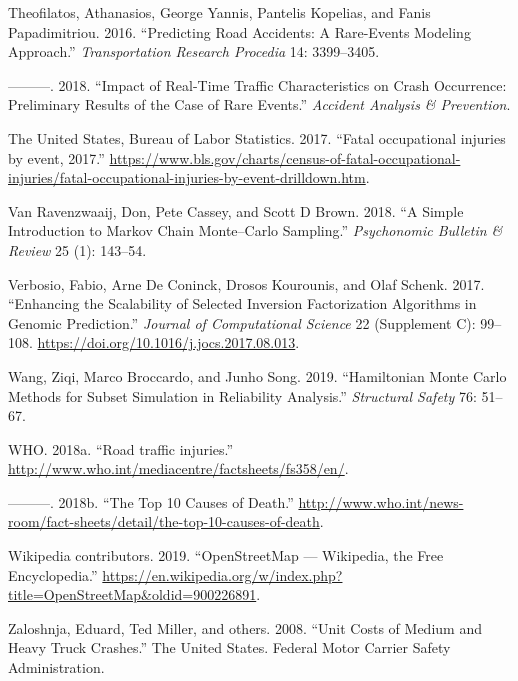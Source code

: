 \documentclass[12pt]{book}
\numberwithin{equation}{chapter}
\begin{document}
\leavevmode\hypertarget{ref-theofilatos2016predicting}{}%
Theofilatos, Athanasios, George Yannis, Pantelis Kopelias, and Fanis Papadimitriou. 2016. ``Predicting Road Accidents: A Rare-Events Modeling Approach.'' \emph{Transportation Research Procedia} 14: 3399--3405.

\leavevmode\hypertarget{ref-theofilatos2018impact}{}%
---------. 2018. ``Impact of Real-Time Traffic Characteristics on Crash Occurrence: Preliminary Results of the Case of Rare Events.'' \emph{Accident Analysis \& Prevention}.

\leavevmode\hypertarget{ref-bols}{}%
The United States, Bureau of Labor Statistics. 2017. ``Fatal occupational injuries by event, 2017.'' \url{https://www.bls.gov/charts/census-of-fatal-occupational-injuries/fatal-occupational-injuries-by-event-drilldown.htm}.

\leavevmode\hypertarget{ref-van2018simple}{}%
Van Ravenzwaaij, Don, Pete Cassey, and Scott D Brown. 2018. ``A Simple Introduction to Markov Chain Monte--Carlo Sampling.'' \emph{Psychonomic Bulletin \& Review} 25 (1): 143--54.

\leavevmode\hypertarget{ref-Verbosio2017}{}%
Verbosio, Fabio, Arne De Coninck, Drosos Kourounis, and Olaf Schenk. 2017. ``Enhancing the Scalability of Selected Inversion Factorization Algorithms in Genomic Prediction.'' \emph{Journal of Computational Science} 22 (Supplement C): 99--108. \url{https://doi.org/10.1016/j.jocs.2017.08.013}.

\leavevmode\hypertarget{ref-wang2019hamiltonian}{}%
Wang, Ziqi, Marco Broccardo, and Junho Song. 2019. ``Hamiltonian Monte Carlo Methods for Subset Simulation in Reliability Analysis.'' \emph{Structural Safety} 76: 51--67.

\leavevmode\hypertarget{ref-who2018b}{}%
WHO. 2018a. ``Road traffic injuries.'' \url{http://www.who.int/mediacentre/factsheets/fs358/en/}.

\leavevmode\hypertarget{ref-who2018}{}%
---------. 2018b. ``The Top 10 Causes of Death.'' \url{http://www.who.int/news-room/fact-sheets/detail/the-top-10-causes-of-death}.

\leavevmode\hypertarget{ref-wikiOSM}{}%
Wikipedia contributors. 2019. ``OpenStreetMap --- Wikipedia, the Free Encyclopedia.'' \url{https://en.wikipedia.org/w/index.php?title=OpenStreetMap\&oldid=900226891}.

\leavevmode\hypertarget{ref-zaloshnja2008unit}{}%
Zaloshnja, Eduard, Ted Miller, and others. 2008. ``Unit Costs of Medium and Heavy Truck Crashes.'' The United States. Federal Motor Carrier Safety Administration.
\end{document}
